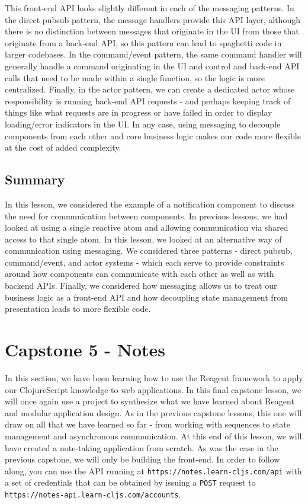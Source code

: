 \documentclass[10pt,twoside,openright]{memoir}
\begin{document}
This front-end API looks slightly different in each of the messaging
patterns. In the direct pubsub pattern, the message handlers provide
this API layer, although there is no distinction between messages that
originate in the UI from those that originate from a back-end API, so
this pattern can lead to spaghetti code in larger codebases. In the
command/event pattern, the same command handler will generally handle a
command originating in the UI and control and back-end API calls that
need to be made within a single function, so the logic is more
centralized. Finally, in the actor pattern, we can create a dedicated
actor whose responsibility is running back-end API requests - and
perhaps keeping track of things like what requests are in progress or
have failed in order to display loading/error indicators in the UI. In
any case, using messaging to decouple components from each other and
core business logic makes our code more flexible at the cost of added
complexity.


\section{Summary}

In this lesson, we considered the example of a notification component to
discuss the need for communication between components. In previous
lessons, we had looked at using a single reactive atom and allowing
communication via shared access to that single atom. In this lesson, we
looked at an alternative way of communication using messaging. We
considered three patterns - direct pubsub, command/event, and actor
systems - which each serve to provide constraints around how components
can communicate with each other as well as with backend APIs. Finally,
we considered how messaging allows us to treat our business logic as a
front-end API and how decoupling state management from presentation
leads to more flexible code.


\chapter{Capstone 5 - Notes}

In this section, we have been learning how to use the Reagent framework
to apply our ClojureScript knowledge to web applications. In this final
capstone lesson, we will once again use a project to synthesize what we
have learned about Reagent and modular application design. As in the
previous capstone lessons, this one will draw on all that we have
learned so far - from working with sequences to state management and
asynchronous communication. At this end of this lesson, we will have
created a note-taking application from scratch. As was the case in the
previous capstone, we will only be building the front-end. In order to
follow along, you can use the API running at
\texttt{https://notes.learn-cljs.com/api} with a set of credentials that
can be obtained by issuing a \texttt{POST} request to
\texttt{https://notes-api.learn-cljs.com/accounts}.
\end{document}
